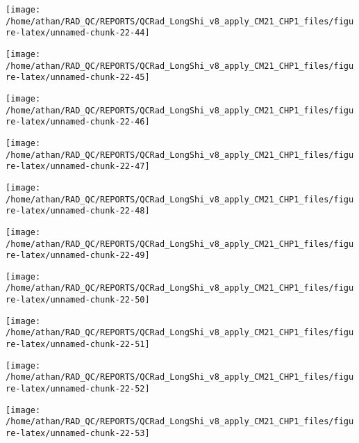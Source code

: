 \documentclass[
  10pt,
  a4paper,oneside]{article}
\begin{document}
\begin{center}\texttt{[image: /home/athan/RAD\_QC/REPORTS/QCRad\_LongShi\_v8\_apply\_CM21\_CHP1\_files/figure-latex/unnamed-chunk-22-44]} \end{center}

\begin{center}\texttt{[image: /home/athan/RAD\_QC/REPORTS/QCRad\_LongShi\_v8\_apply\_CM21\_CHP1\_files/figure-latex/unnamed-chunk-22-45]} \end{center}

\begin{center}\texttt{[image: /home/athan/RAD\_QC/REPORTS/QCRad\_LongShi\_v8\_apply\_CM21\_CHP1\_files/figure-latex/unnamed-chunk-22-46]} \end{center}

\begin{center}\texttt{[image: /home/athan/RAD\_QC/REPORTS/QCRad\_LongShi\_v8\_apply\_CM21\_CHP1\_files/figure-latex/unnamed-chunk-22-47]} \end{center}

\begin{center}\texttt{[image: /home/athan/RAD\_QC/REPORTS/QCRad\_LongShi\_v8\_apply\_CM21\_CHP1\_files/figure-latex/unnamed-chunk-22-48]} \end{center}

\begin{center}\texttt{[image: /home/athan/RAD\_QC/REPORTS/QCRad\_LongShi\_v8\_apply\_CM21\_CHP1\_files/figure-latex/unnamed-chunk-22-49]} \end{center}

\begin{center}\texttt{[image: /home/athan/RAD\_QC/REPORTS/QCRad\_LongShi\_v8\_apply\_CM21\_CHP1\_files/figure-latex/unnamed-chunk-22-50]} \end{center}

\begin{center}\texttt{[image: /home/athan/RAD\_QC/REPORTS/QCRad\_LongShi\_v8\_apply\_CM21\_CHP1\_files/figure-latex/unnamed-chunk-22-51]} \end{center}

\begin{center}\texttt{[image: /home/athan/RAD\_QC/REPORTS/QCRad\_LongShi\_v8\_apply\_CM21\_CHP1\_files/figure-latex/unnamed-chunk-22-52]} \end{center}

\begin{center}\texttt{[image: /home/athan/RAD\_QC/REPORTS/QCRad\_LongShi\_v8\_apply\_CM21\_CHP1\_files/figure-latex/unnamed-chunk-22-53]} \end{center}
\end{document}
